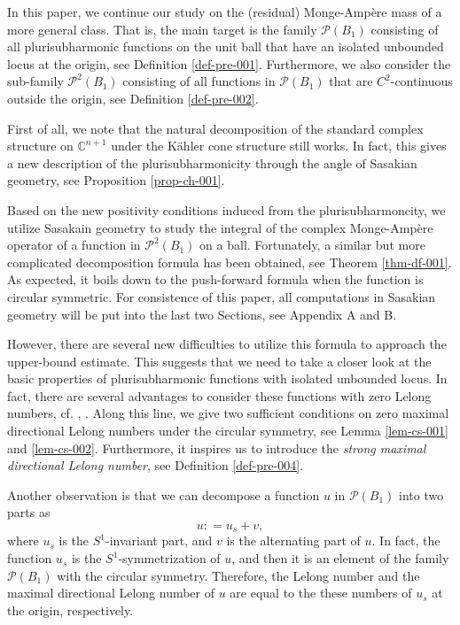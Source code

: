 \documentclass[a4paper,11pt]{amsart}
\numberwithin{equation}{section}
\def\cP{{\mathcal P}}
\def\cP{{\mathcal P}}
\def\bC{{\mathbb C}}
\begin{document}
In this paper, 
we continue our study on the (residual) Monge-Amp\`ere mass 
of a more general class.
That is, the main target is the family $\cP(B_1)$ 
consisting of all plurisubharmonic functions on the unit ball 
that have an isolated unbounded locus at the origin,
see Definition \ref{def-pre-001}. 
Furthermore, 
we also consider the sub-family $\cP^2(B_1)$ consisting of 
all functions in $\cP(B_1)$ that are $C^2$-continuous outside the origin,
see Definition \ref{def-pre-002}. 

First of all, 
we note that the natural decomposition of the standard complex structure on $\bC^{n+1}$
under the K\"ahler cone structure still works. 
In fact, this gives a new description 
of the plurisubharmonicity through the angle of Sasakian geometry, see Proposition \ref{prop-ch-001}.

Based on the new positivity conditions induced from the plurisubharmoncity, 
we utilize Sasakain geometry to
study the integral of the complex Monge-Amp\`ere operator of 
a function in $\cP^2(B_1)$ on a ball. 
Fortunately, 
a similar but more complicated decomposition formula has been obtained, see Theorem \ref{thm-df-001}. 
As expected, 
it boils down to the push-forward formula when the function is circular symmetric. 
For consistence of this paper, all computations in Sasakian geometry will be put 
into the last two Sections, see Appendix A and B.


However, there are several new difficulties 
to utilize this formula to approach the upper-bound estimate. 
This suggests that 
we need to take a closer look at the basic properties of plurisubharmonic functions with isolated unbounded locus. 
In fact,
there are several advantages to consider these functions with zero Lelong numbers, cf. \cite{SW24}, \cite{CW21}. 
Along this line, 
we give two sufficient conditions on  
zero maximal directional Lelong numbers under the circular symmetry, 
see Lemma \ref{lem-cs-001} and \ref{lem-cs-002}. 
Furthermore, 
it inspires us to introduce the \emph{strong maximal directional Lelong number},
see Definition \ref{def-pre-004}.

Another observation is that 
we can decompose a function $u$ in $\cP(B_1)$ into two parts as
\begin{equation}
\label{i-001}
 u: = u_s + v, 
\end{equation}
where $u_s$ is the $S^1$-invariant part, and $v$ is the alternating part of $u$. 
In fact, the function $u_s$ is the $S^1$-symmetrization of $u$, 
and then it is an element of the family $\cP(B_1)$ with the circular symmetry. 
Therefore,
the Lelong number
and the maximal directional Lelong number 
of $u$ are equal to the these numbers of $u_s$ at the origin, respectively. 
\end{document}
